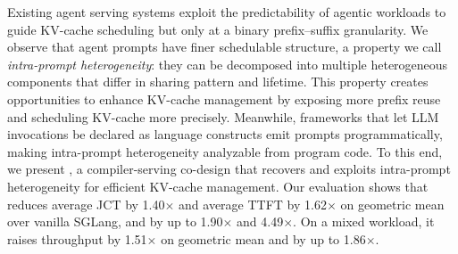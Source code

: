Existing agent serving systems exploit the predictability of agentic workloads to guide KV-cache scheduling but only at a binary prefix--suffix granularity. We observe that agent prompts have finer schedulable structure, a property we call \emph{intra-prompt heterogeneity}: they can be decomposed into multiple heterogeneous components that differ in sharing pattern and lifetime. This property creates opportunities to enhance KV-cache management by exposing more prefix reuse and scheduling KV-cache more precisely. Meanwhile, frameworks that let LLM invocations be declared as language constructs emit prompts programmatically, making intra-prompt heterogeneity analyzable from program code. To this end, we present \sysname, a compiler-serving co-design that recovers and exploits intra-prompt heterogeneity for efficient KV-cache management. Our evaluation shows that \sysname reduces average JCT by 1.40$\times$ and average TTFT by 1.62$\times$ on geometric mean over vanilla SGLang, and by up to 1.90$\times$ and 4.49$\times$. On a mixed workload, it raises throughput by 1.51$\times$ on geometric mean and by up to 1.86$\times$.
